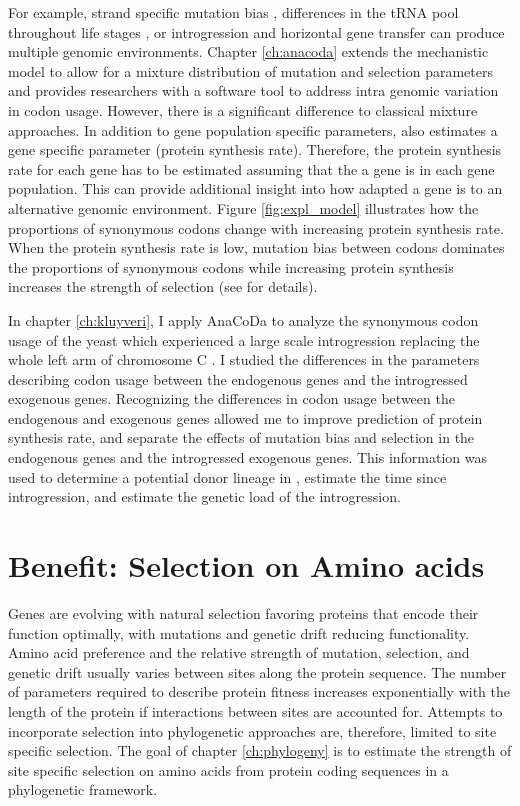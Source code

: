 For example, strand specific mutation bias \citep{Lafay1999,Romero2000}, differences in the tRNA pool throughout life stages \citep{sagi2016}, or introgression and horizontal gene transfer \citep{medigue1991,lawrence1997} can produce multiple genomic environments.
Chapter \ref{ch:anacoda} extends the mechanistic model \ROC \cite{gilchrist2015} to allow for a mixture distribution of mutation and selection parameters \cite{landerer2018} and provides researchers with a software tool to address intra genomic variation in codon usage.
However, there is a significant difference to classical mixture approaches.
In addition to gene population specific parameters, \ROC also estimates a gene specific parameter (protein synthesis rate). 
Therefore, the protein synthesis rate for each gene has to be estimated assuming that the a gene is in each gene population.
This can provide additional insight into how adapted a gene is to an alternative genomic environment.
Figure \ref{fig:expl_model} illustrates how the proportions of synonymous codons change with increasing protein synthesis rate.
When the protein synthesis rate is low, mutation bias between codons dominates the proportions of synonymous codons while increasing protein synthesis increases the strength of selection (see \cite{gilchrist2015} for details). 

In chapter \ref{ch:kluyveri}, I apply AnaCoDa to analyze the synonymous codon usage of the yeast \kluyveri which experienced a large scale introgression replacing the whole left arm of chromosome C \citep{friedrich2015}.
I studied the differences in the parameters describing codon usage between the endogenous \kluyveri genes and the introgressed exogenous genes.
Recognizing the differences in codon usage between the endogenous and exogenous genes allowed me to improve prediction of protein synthesis rate, and separate the effects of mutation bias and selection in the endogenous \kluyveri genes and the introgressed exogenous genes.
This information was used to determine a potential donor lineage in \gossypii, estimate the time since introgression, and estimate the genetic load of the introgression.

\section{Benefit: Selection on Amino acids}
Genes are evolving with natural selection favoring proteins that encode their function optimally, with mutations and genetic drift reducing functionality.
Amino acid preference and the relative strength of mutation, selection, and genetic drift usually varies between sites along the protein sequence.
The number of parameters required to describe protein fitness increases exponentially with the length of the protein if interactions between sites are accounted for.
Attempts to incorporate selection into phylogenetic approaches are, therefore, limited to site specific selection.
The goal of chapter \ref{ch:phylogeny} is to estimate the strength of site specific selection on amino acids from protein coding sequences in a phylogenetic framework.

